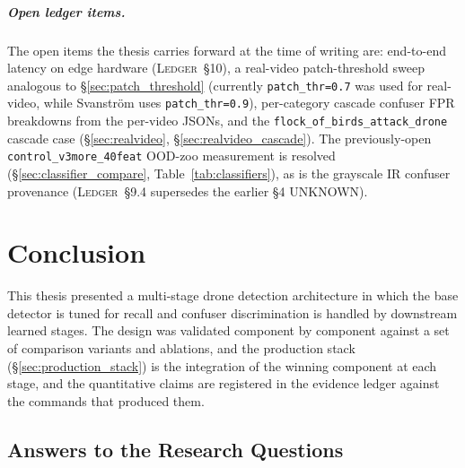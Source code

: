 \documentclass[12pt,a4paper,oneside,openright]{book}
\begin{document}
\paragraph{Open ledger items.}
The open items the thesis carries forward at the time of writing are: end-to-end latency on edge hardware (\textsc{Ledger}~\S10), a real-video patch-threshold sweep analogous to \S\ref{sec:patch_threshold} (currently \texttt{patch\_thr=0.7} was used for real-video, while Svanstr\"om uses \texttt{patch\_thr=0.9}), per-category cascade confuser FPR breakdowns from the per-video JSONs, and the \texttt{flock\_of\_birds\_attack\_drone} cascade case (\S\ref{sec:realvideo}, \S\ref{sec:realvideo_cascade}). The previously-open \texttt{control\_v3more\_40feat} OOD-zoo measurement is resolved (\S\ref{sec:classifier_compare}, Table~\ref{tab:classifiers}), as is the grayscale IR confuser provenance (\textsc{Ledger}~\S9.4 supersedes the earlier \S4 UNKNOWN).

\chapter{Conclusion}
\label{ch:conclusion}

This thesis presented a multi-stage drone detection architecture in which the base detector is tuned for recall and confuser discrimination is handled by downstream learned stages. The design was validated component by component against a set of comparison variants and ablations, and the production stack (\S\ref{sec:production_stack}) is the integration of the winning component at each stage, and the quantitative claims are registered in the evidence ledger against the commands that produced them.

\section{Answers to the Research Questions}
\label{sec:rq_answers}
\end{document}
